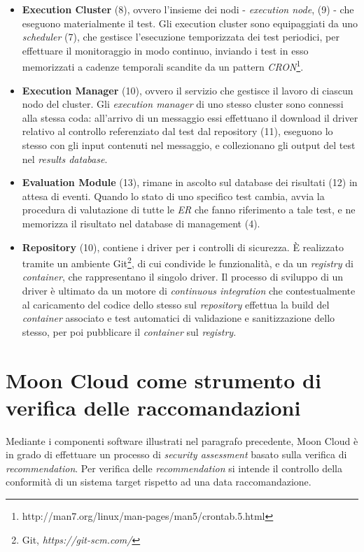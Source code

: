 \documentclass[../main.tex]{subfiles}
\begin{document}
\begin{itemize}
    \item \textbf{Execution Cluster} (8), ovvero l'insieme dei nodi - \textit{execution node}, (9)  - che eseguono materialmente il test. Gli execution cluster sono equipaggiati da uno \textit{scheduler} (7), che gestisce l'esecuzione temporizzata dei test periodici, per effettuare il monitoraggio in modo continuo, inviando i test in esso memorizzati a cadenze temporali scandite da un pattern \textit{CRON}\footnote{http://man7.org/linux/man-pages/man5/crontab.5.html}.
    \item \textbf{Execution Manager} (10), ovvero il servizio che gestisce il lavoro di ciascun nodo del cluster.        
        Gli \textit{execution manager} di uno stesso cluster sono connessi alla stessa coda: all'arrivo di un messaggio essi effettuano il download il driver relativo al controllo referenziato dal test dal repository (11), eseguono lo stesso con gli input contenuti nel messaggio, e collezionano gli output del test nel \textit{results database}. 
    \item \textbf{Evaluation Module} (13), rimane in ascolto sul database dei risultati (12) in attesa di eventi. Quando lo stato di uno specifico test cambia, avvia la procedura di valutazione di tutte le \textit{ER} che fanno riferimento a tale test, e ne memorizza il risultato nel database di management (4).
    \item \textbf{Repository} (10), contiene i driver per i controlli di sicurezza. È realizzato tramite un ambiente Git\footnote{Git, \textit{https://git-scm.com/}}, di cui condivide le funzionalità, e da un \textit{registry} di \textit{container}, che rappresentano il singolo driver. Il processo di sviluppo di un driver è ultimato da un motore di \textit{continuous integration} che contestualmente al caricamento del codice dello stesso sul \textit{repository} effettua la build del \textit{container} associato e test automatici di validazione e sanitizzazione dello stesso, per poi pubblicare il \textit{container} sul \textit{registry}.
\end{itemize}
\section{Moon Cloud come strumento di verifica delle raccomandazioni}
Mediante i componenti software illustrati nel paragrafo precedente, Moon Cloud è in grado di effettuare un processo di \textit{security assessment} basato sulla verifica di \textit{recommendation}.
Per verifica delle \textit{recommendation} si intende il controllo  della conformità di un sistema target rispetto ad una data raccomandazione.
\end{document}
